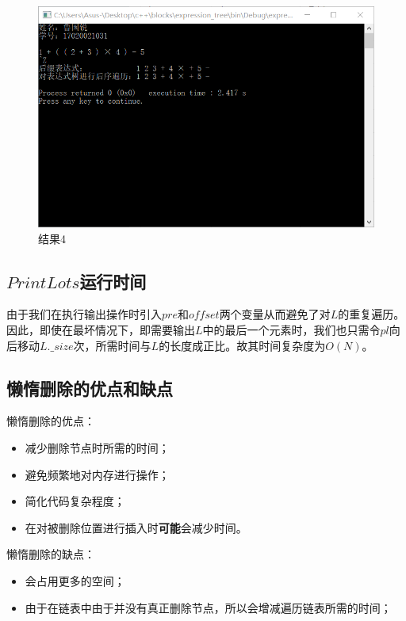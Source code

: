 \documentclass[UTF8]{ctexart}
\begin{document}
\begin{figure}[H]
	\centering 
	\includegraphics[scale=0.85]{res4.png} 
	\caption{结果4} 
	\label{res4}
\end{figure}

	\subsection{$PrintLots$运行时间}\label{time_of_PrintLots}
	\indent 由于我们在执行输出操作时引入$pre$和$offset$两个变量从而避免了对$L$的重复遍历。因此，即使在最坏情况下，即需要输出$L$中的最后一个元素时，我们也只需令$pl$向后移动$L.\_size$次，所需时间与$L$的长度成正比。故其时间复杂度为$O(N)$。
	
	\subsection{懒惰删除的优点和缺点}\label{adv_and_disadv_of_lazy_deletion}
	\indent 懒惰删除的优点：
	\begin{itemize}[leftmargin=50pt]
	\item 减少删除节点时所需的时间；
	\item 避免频繁地对内存进行操作；
	\item 简化代码复杂程度；
	\item 在对被删除位置进行插入时\textbf{可能}会减少时间。
	\end{itemize}
	
	\indent 懒惰删除的缺点：
	\begin{itemize}[leftmargin=50pt]
	\item 会占用更多的空间；
	\item 由于在链表中由于并没有真正删除节点，所以会增减遍历链表所需的时间；
	\end{itemize}
\end{document}
